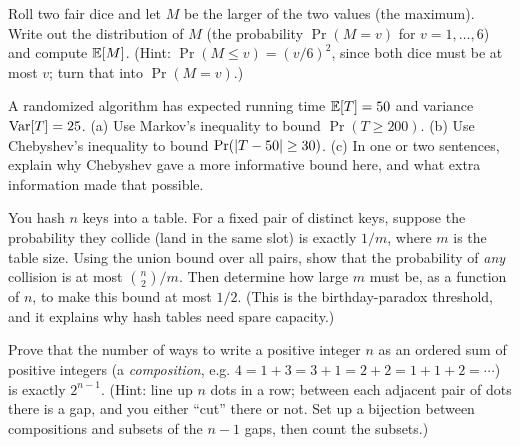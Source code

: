 \begin{exercise}
Roll two fair dice and let $M$ be the larger of the two values (the maximum). Write out
the distribution of $M$ (the probability $\Pr(M = v)$ for $v = 1, \dots, 6$) and
compute $\mathbb{E}[M]$. (Hint: $\Pr(M \le v) = (v/6)^2$, since both dice must be at most $v$;
turn that into $\Pr(M = v)$.)
\end{exercise}

\begin{exercise}
A randomized algorithm has expected running time $\mathbb{E}[T] = 50$ and variance
$\operatorname{Var}[T] = 25$. (a) Use Markov's inequality to bound $\Pr(T \ge 200)$. (b) Use
Chebyshev's inequality to bound $\Pr(\lvert T - 50\rvert \ge 30)$. (c) In one or two
sentences, explain why Chebyshev gave a more informative bound here, and what extra
information made that possible.
\end{exercise}

\begin{exercise}
\label{ch38:ex-uniondesign}
You hash $n$ keys into a table. For a fixed pair of distinct keys, suppose the
probability they collide (land in the same slot) is exactly $1/m$, where $m$ is the
table size. Using the union bound over all pairs, show that the probability of
\emph{any} collision is at most $\binom{n}{2}/m$. Then determine how large $m$ must be,
as a function of $n$, to make this bound at most $1/2$. (This is the birthday-paradox
threshold, and it explains why hash tables need spare capacity.)
\end{exercise}

\begin{exercise}
Prove that the number of ways to write a positive integer $n$ as an ordered sum of
positive integers (a \emph{composition}, e.g. $4 = 1+3 = 3+1 = 2+2 = 1+1+2 = \cdots$)
is exactly $2^{n-1}$. (Hint: line up $n$ dots in a row; between each adjacent pair of
dots there is a gap, and you either ``cut'' there or not. Set up a bijection between
compositions and subsets of the $n-1$ gaps, then count the subsets.)
\end{exercise}
